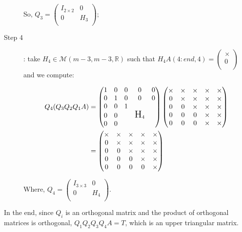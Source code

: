 \documentclass[computational_mathematics.tex]{subfiles}
\begin{document}
\begin{example}
\begin{description}
      So, $Q_{3} =
      \begin{pmatrix}
        I_{2 \times 2} & 0\\
        0 & H_{3}\\
      \end{pmatrix}$;

  \item[{\sc Step 4}]: take $H_{4} \in \mathcal{M}(m-3, m-3, \mathds{R})$ such that $H_{4}A(4:end, 4) = \begin{pmatrix} \times\\ 0\\ \end{pmatrix}$ and we compute:

   \begin{equation}
        \begin{aligned}
          Q_4 (Q_3 Q_2 Q_1 A)
          &=  \begin{pmatrix}
          1 & 0 & 0 & 0 & 0\\
          0 & 1 & 0 & 0 & 0\\
          0 & 0 & 1 & \\
          0 & 0 && \text{\Large H}_4\\
          0 & 0 &&\\
        \end{pmatrix}
        \begin{pmatrix}
          \times & \times & \times & \times & \times\\
          0 & \times & \times & \times & \times\\
          0 & 0 & \times & \times & \times\\
          0 & 0 & 0 & \times & \times\\
          0 & 0 & 0 & \times & \times\\
        \end{pmatrix}\\
        &= \begin{pmatrix}
          \times & \times & \times & \times & \times\\
          0 & \times & \times & \times & \times\\
          0 & 0 & \times & \times & \times\\
          0 & 0 & 0 & \times & \times\\
          0 & 0 & 0 & 0 & \times\\
        \end{pmatrix}
        \end{aligned}
      \end{equation}

Where, $Q_{4} =
      \begin{pmatrix}
        I_{3 \times 3} & 0\\
        0 & H_{4}\\
      \end{pmatrix}$. 
\end{description}

  In the end, since $Q_{i}$ is an orthogonal matrix and the product of orthogonal matrices is orthogonal, $Q_{1} Q_{2} Q_{3} Q_{4} A = T$, which is an upper triangular matrix.
\end{example}
\end{document}
